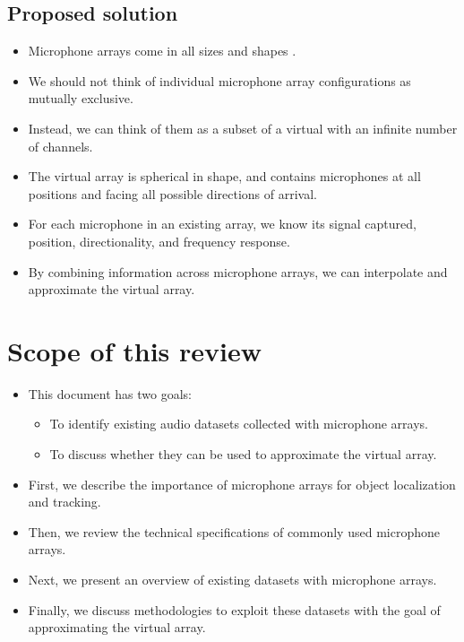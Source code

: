 \documentclass[14pt, oneside]{extarticle}
\begin{document}
\subsection{Proposed solution}

\begin{itemize}

\item Microphone arrays come in all sizes and shapes \cite{kurz2015comparison, bates2017comparing, lopez2019sphear}. 

\item We should not think of individual microphone array configurations as mutually exclusive.

\item Instead, we can think of them as a subset of a virtual with an infinite number of channels.

\item The virtual array is spherical in shape, and contains microphones at all positions and facing all possible directions of arrival.

\item For each microphone in an existing array, we know its signal captured, position, directionality, and frequency response. 

\item By combining information across microphone arrays, we can interpolate and approximate the virtual array.

\end{itemize}

\section{Scope of this review}

\begin{itemize}

\item This document has two goals:
	\begin{itemize}
	\item To identify existing audio datasets collected with microphone arrays. 
	\item To discuss whether they can be used to approximate the virtual array. 
	\end{itemize}

\item First, we describe the importance of microphone arrays for object localization and tracking.

\item Then, we review the technical specifications of commonly used microphone arrays.

\item Next, we present an overview of existing datasets with microphone arrays.

\item Finally, we discuss methodologies to exploit these datasets with the goal of approximating the virtual array.  

\end{itemize}
\end{document}
